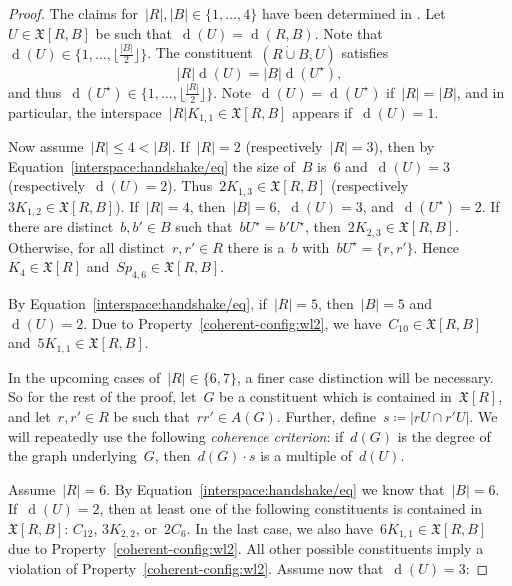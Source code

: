 \documentclass[english,a4paper]{article}
\theoremstyle{plain}
\theoremstyle{definition}
\newcommand{\abs}[1]{| #1 |}
\newcommand{\disjointUnion}{\ensuremath{\mathbin{\dot{\cup}}}}
\newcommand{\coherentConfig}{\ensuremath{\mathfrak{X}}}
\newcommand{\interspace}[2]{\ensuremath{\coherentConfig[#1,#2]}}
\newcommand{\inducedCC}[1]{\ensuremath{\coherentConfig[#1]}}
\newcommand{\intDegree}[1]{\ensuremath{\Deg \left( #1 \right)}}
\newcommand{\minimalDegree}[2]{\Deg(#1,#2)}
\newcommand{\arcs}{\ensuremath{A}}
\DeclareMathOperator{\Deg}{d}
\newcommand{\clique}[1]{\ensuremath{K_{#1}}}
\newcommand{\cycle}[1]{\ensuremath{C_{#1}}}
\newcommand{\disjointCliques}[2]{\ensuremath{#1 \clique{#2}}}
\newcommand{\matching}[1]{\ensuremath{#1 K_{1,1}}}
\newcommand{\interspaceFourSix}{\ensuremath{Sp_{4,6}}}
\begin{document}
\begin{proof}
    The claims for~$\abs{R},\abs{B} \in \{1,\dots,4\}$ have been determined in \cite[Figures 2 and 3]{DBLP:journals/siamdm/FuhlbruckKV21}.
    Let~$U \in \interspace{R}{B}$ be such that~$\intDegree{U} = \minimalDegree{R}{B}$.
    Note that~$\intDegree{U} \in \{1,\dots,\lfloor \frac{\abs{B}}{2} \rfloor\}$.
    The constituent~$(R \disjointUnion B, U)$ satisfies~
    \begin{equation}
    \label{interspace:handshake/eq}
        \abs{R}\intDegree{U} = \abs{B} \intDegree{U^\star},
    \end{equation}
    and thus~$\intDegree{U^\star} \in \{1,\dots,\lfloor \frac{\abs{R}}{2} \rfloor\}$.
    Note~$\intDegree{U} = \intDegree{U^\star}$ if~$\abs{R} = \abs{B}$, and in  particular, the interspace~$\matching{\abs{R}} \in \interspace{R}{B}$ appears if~$\intDegree{U} = 1$.

    Now assume~$\abs{R} \leq 4 < \abs{B}$.
    If~$\abs{R} = 2$ (respectively~$\abs{R} = 3$), then by Equation~\eqref{interspace:handshake/eq} the size of~$B$ is~$6$ and~$\intDegree{U} = 3$ (respectively~$\intDegree{U} = 2$).
    Thus~$\disjointCliques{2}{1,3} \in \interspace{R}{B}$ (respectively~$\disjointCliques{3}{1,2} \in \interspace{R}{B}$).
    If~$\abs{R} = 4$, then~$\abs{B} = 6$,~$\intDegree{U} = 3$, and~$\intDegree{U^\star} = 2$.
    If there are distinct~$b,b' \in B$ such that~$bU^\star = b'U^\star$, then~$\disjointCliques{2}{2,3} \in \interspace{R}{B}$.
    Otherwise, for all distinct~$r,r' \in R$ there is a~$b$ with~$bU^\star = \{r,r'\}$.
    Hence~$\clique{4} \in \inducedCC{R}$ and~$\interspaceFourSix \in \interspace{R}{B}$.

    By Equation~\eqref{interspace:handshake/eq}, if~$\abs{R} = 5$, then~$\abs{B} = 5$ and~$\intDegree{U} = 2$.
    Due to Property~\ref{coherent-config:wl2}, we have~$\cycle{10} \in \interspace{R}{B}$ and~$\matching{5} \in \interspace{R}{B}$.

    In the upcoming cases of~$\abs{R} \in \{6,7\}$, a finer case distinction will be necessary.
    So for the rest of the proof, let~$G$ be a constituent which is contained in~$\inducedCC{R}$, and let~$r,r'\in  R$ be such that~$rr' \in \arcs(G)$.
    Further, define~$s \coloneqq \abs{rU \cap r'U}$. We will repeatedly use the following \emph{coherence criterion}:
    if~$d(G)$ is the degree of the graph underlying~$G$, then~$d(G)\cdot s$ is a multiple of~$d(U)$.

    Assume~$\abs{R} = 6$. By Equation~\eqref{interspace:handshake/eq} we know that~$\abs{B} = 6$.
    If~$\intDegree{U} = 2$, then at least one of the following constituents is contained in~$\interspace{R}{B}$:
    $\cycle{12}$, $\disjointCliques{3}{2,2}$, or~$2\cycle{6}$.
    In the last case, we also have~$\matching{6} \in \interspace{R}{B}$ due to Property~\ref{coherent-config:wl2}.
    All other possible constituents imply a violation of Property~\ref{coherent-config:wl2}.
    Assume now that~$\intDegree{U} = 3$:


\end{proof}
\end{document}
